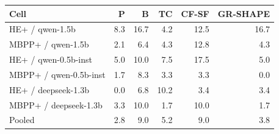\begin{tabular}{l r r r r r}
\toprule
Cell & P & B & TC & CF-SF & GR-SHAPE \\
\midrule
HE+ / qwen-1.5b & 8.3 & 16.7 & 4.2 & 12.5 & 16.7 \\
MBPP+ / qwen-1.5b & 2.1 & 6.4 & 4.3 & 12.8 & 4.3 \\
HE+ / qwen-0.5b-inst & 5.0 & 10.0 & 7.5 & 17.5 & 5.0 \\
MBPP+ / qwen-0.5b-inst & 1.7 & 8.3 & 3.3 & 3.3 & 0.0 \\
HE+ / deepseek-1.3b & 0.0 & 6.8 & 10.2 & 3.4 & 3.4 \\
MBPP+ / deepseek-1.3b & 3.3 & 10.0 & 1.7 & 10.0 & 1.7 \\
Pooled & 2.8 & 9.0 & 5.2 & 9.0 & 3.8 \\
\bottomrule
\end{tabular}
